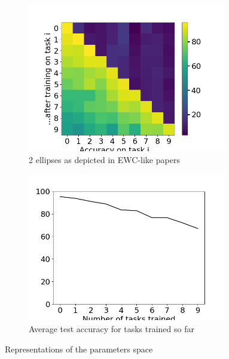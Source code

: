 \documentclass[11pt]{article}
\begin{document}
\begin{figure}
    \centering
    \begin{subfigure}[b]{0.35\textwidth}
        \centering
        \includegraphics[width=0.95\textwidth]{images/accs_matrix_greedy_HPO_GroHess_from_output_pMNIST_via_torch_standard_2024-07-16_20-41-35.png}
        \caption{2 ellipses as depicted in EWC-like papers}
        \label{fig:test_accs_matrix}
    \end{subfigure}
    \hspace{-0mm}
    \begin{subfigure}[b]{0.35\textwidth}
        \centering
        \includegraphics[width=0.95\textwidth]{images/avg_acc_curve_greedy_HPO_GroHess_from_output_pMNIST_via_torch_standard_2024-07-16_20-41-35.png}
        \caption{Average test accuracy for tasks trained so far}
        \label{fig:classic_plot}
    \end{subfigure}
    \caption{Representations of the parameters space}
\end{figure}
\end{document}
